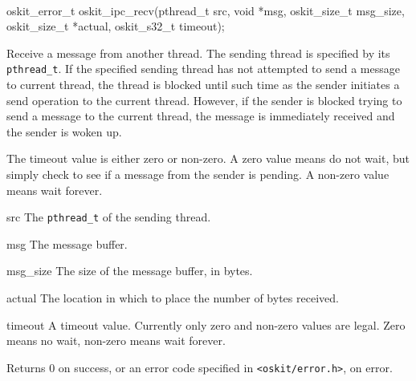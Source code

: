 \begin{apisyn}
	\\

	\funcproto oskit_error_t
	oskit_ipc_recv(pthread_t src,
		       void *msg, oskit_size_t msg_size, oskit_size_t *actual,
		       oskit_s32_t timeout);
\end{apisyn}
\begin{apidesc}
	Receive a message from another thread. The sending thread is
	specified by its {\tt pthread_t}. If the specified sending thread
	has not attempted to send a message to current thread, the thread
	is blocked until such time as the sender initiates a send operation
	to the current thread. However, if the sender is blocked trying to
	send a message to the current thread, the message is immediately
	received and the sender is woken up.

	The timeout value is either zero or non-zero. A zero value means do
	not wait, but simply check to see if a message from the sender is
	pending. A non-zero value means wait forever.
\end{apidesc}
\begin{apiparm}
	\item[src]
		The {\tt pthread_t} of the sending thread.
	\item[msg]
		The message buffer.
	\item[msg_size]
		The size of the message buffer, in bytes.
	\item[actual]
		The location in which to place the number of bytes received.
	\item[timeout]
		A timeout value. Currently only zero and non-zero values
		are legal. Zero means no wait, non-zero means wait forever.
\end{apiparm}
\begin{apiret}
	Returns 0 on success, or an error code specified in
	{\tt <oskit/error.h>}, on error.
\end{apiret}


